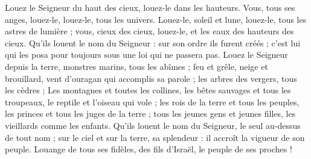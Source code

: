 Louez le Seigneur du haut des cieux, louez-le dans les hauteurs.
\versseparator
Vous, tous ses anges, louez-le, louez-le, tous les univers.
\versseparator
Louez-le, soleil et lune, louez-le, tous les astres de lumière ;
\versseparator
vous, cieux des cieux, louez-le, et les eaux des hauteurs des cieux.
\versseparator
Qu'ils louent le nom du Seigneur : sur son ordre ils furent créés ;
\versseparator
c'est lui qui les posa pour toujours sous une loi qui ne passera pas.
\versseparator
Louez le Seigneur depuis la terre, monstres marins, tous les abîmes ;
\versseparator
feu et grêle, neige et brouillard, vent d'ouragan qui accomplis sa parole ; les arbres des vergers, tous les cèdres ;
\versseparator
Les montagnes et toutes les collines,
\versseparator
les bêtes sauvages et tous les troupeaux, le reptile et l'oiseau qui vole ;
\versseparator
les rois de la terre et tous les peuples, les princes et tous les juges de la terre ;
\versseparator
tous les jeunes gens et jeunes filles, les vieillards comme les enfants.
\versseparator
Qu'ils louent le nom du Seigneur, le seul au-dessus de tout nom ; sur le ciel et sur la terre, sa splendeur :
\versseparator
il accroît la vigueur de son peuple. Louange de tous ses fidèles, des fils d'Israël, le peuple de ses proches !
